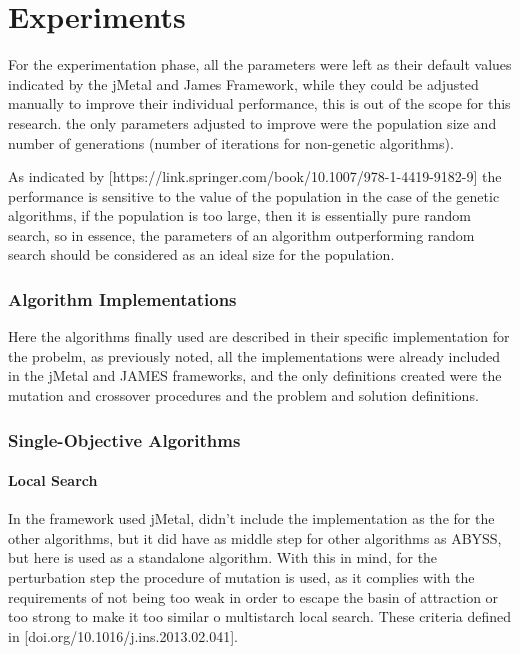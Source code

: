 \chapter{Experiments}
\label{chapter:chapter05}

For the experimentation phase, all the parameters were left as their default values indicated by the jMetal and James Framework, while they could be adjusted manually to improve their individual performance, this is out of the scope for this research. the only parameters adjusted to improve were the population size and number of generations (number of iterations for non-genetic algorithms).


As indicated by [https://link.springer.com/book/10.1007/978-1-4419-9182-9] the performance is sensitive to the value of the population in the case of the genetic algorithms, if the population is too large, then it is essentially pure random search, so in essence, the parameters of an algorithm outperforming random search should be considered as an ideal size for the population.

\subsection{Algorithm Implementations}

Here the algorithms finally used are described in their specific implementation for the probelm, as previously noted, all the implementations were already included in the jMetal and JAMES frameworks, and the only definitions created were the mutation and crossover procedures and the problem and solution definitions.

\subsection{Single-Objective Algorithms}

\subsubsection{Local Search}

In the framework used jMetal, didn't include the implementation as the for the other algorithms, but it did have as middle step for other algorithms as ABYSS, but here is used as a standalone algorithm. With this in mind, for the perturbation step the procedure of mutation is used, as it complies with the requirements of not being too weak in order to escape the basin of attraction or too strong to make it too similar o multistarch local search. These criteria defined in [doi.org/10.1016/j.ins.2013.02.041].

